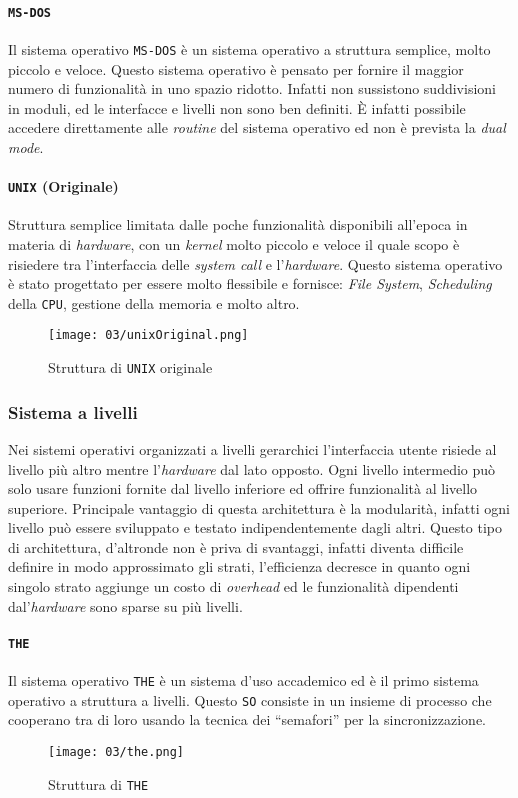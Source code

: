         \paragraph{\texttt{MS-DOS}} Il sistema operativo \texttt{MS-DOS} è un sistema operativo a struttura semplice, molto piccolo e veloce. Questo sistema operativo è pensato per fornire il maggior numero di funzionalità in uno spazio ridotto. Infatti non sussistono suddivisioni in moduli, ed le interfacce e livelli non sono ben definiti. È infatti possibile accedere direttamente alle \textit{routine} del sistema operativo ed non è prevista la \textit{dual mode}.
        \paragraph{\texttt{UNIX} (Originale)} Struttura semplice limitata dalle poche funzionalità disponibili all'epoca in materia di \textit{hardware}, con un \textit{kernel} molto piccolo e veloce il quale scopo è risiedere tra l'interfaccia delle \textit{system call} e l'\textit{hardware}. Questo sistema operativo è stato progettato per essere molto flessibile e fornisce: \textit{File System}, \textit{Scheduling} della \texttt{CPU}, gestione della memoria e molto altro.
        \begin{figure}[H]
            \centering
            \texttt{[image: 03/unixOriginal.png]}
            \caption{Struttura di \texttt{UNIX} originale}
        \end{figure}
    \subsubsection{Sistema a livelli}
        Nei sistemi operativi organizzati a livelli gerarchici l'interfaccia utente risiede al livello più altro mentre l'\textit{hardware} dal lato opposto. Ogni livello intermedio può solo usare funzioni fornite dal livello inferiore ed offrire funzionalità al livello superiore. Principale vantaggio di questa architettura è la modularità, infatti ogni livello può essere sviluppato e testato indipendentemente dagli altri. Questo tipo di architettura, d'altronde non è priva di svantaggi, infatti diventa difficile definire in modo approssimato gli strati, l'efficienza decresce in quanto ogni singolo strato aggiunge un costo di \textit{overhead} ed le funzionalità dipendenti dal'\textit{hardware} sono sparse su più livelli.
        \paragraph{\texttt{THE}} Il sistema operativo \texttt{THE} è un sistema d'uso accademico ed è il primo sistema operativo a struttura a livelli. Questo \texttt{SO} consiste in un insieme di processo che cooperano tra di loro usando la tecnica dei ``semafori'' per la sincronizzazione. \begin{figure}[H]
            \centering
            \texttt{[image: 03/the.png]}
            \caption{Struttura di \texttt{THE}}
        \end{figure}
    
